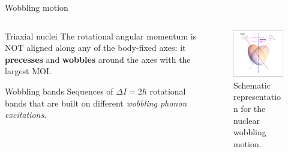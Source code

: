 \documentclass{beamer}
\begin{document}
\begin{frame}{Wobbling motion}
  \begin{columns}
    \begin{column}{0.47\textwidth}
    \begin{block}{Triaxial nuclei}
    The rotational angular momentum is NOT aligned along any of the body-fixed axes: it \textbf{precesses} and \textbf{wobbles} around the axes with the largest MOI. 
    \end{block}
  \begin{block}{Wobbling bands}
  Sequences of $\Delta I=2\hbar$ rotational bands that are built on different \textit{wobbling phonon excitations}.
  \end{block}
    \end{column}
    \begin{column}{0.53\textwidth}  %
         \begin{figure}
          \centering
          \includegraphics[scale=0.35]{figs/wobbling_drawing.png}
          \caption{Schematic representation for the nuclear wobbling motion.}
          \label{wobbling_picture}
      \end{figure}
  
    \end{column}
    \end{columns}
\end{frame}
\end{document}
